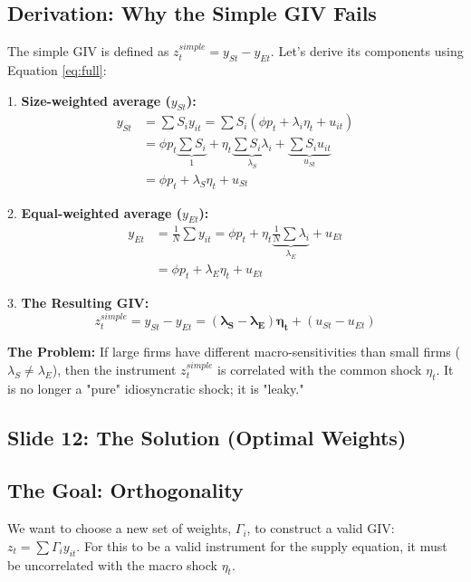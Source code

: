 \documentclass[12pt]{article}
\begin{document}
\subsection{Derivation: Why the Simple GIV Fails}
The simple GIV is defined as $z_t^{simple} = y_{St} - y_{Et}$. Let's derive its components using Equation \ref{eq:full}:

1. \textbf{Size-weighted average ($y_{St}$):}
\begin{align*}
    y_{St} & = \sum S_i y_{it} = \sum S_i (\phi p_t + \lambda_i \eta_t + u_{it})                                                               \\
           & = \phi p_t \underbrace{\sum S_i}_{1} + \eta_t \underbrace{\sum S_i \lambda_i}_{\lambda_S} + \underbrace{\sum S_i u_{it}}_{u_{St}} \\
           & = \phi p_t + \lambda_S \eta_t + u_{St}
\end{align*}

2. \textbf{Equal-weighted average ($y_{Et}$):}
\begin{align*}
    y_{Et} & = \frac{1}{N} \sum y_{it} = \phi p_t + \eta_t \underbrace{\frac{1}{N} \sum \lambda_i}_{\lambda_E} + u_{Et} \\
           & = \phi p_t + \lambda_E \eta_t + u_{Et}
\end{align*}

3. \textbf{The Resulting GIV:}
\begin{equation}
    z_t^{simple} = y_{St} - y_{Et} = \mathbf{(\lambda_S - \lambda_E) \eta_t} + (u_{St} - u_{Et})
\end{equation}

\textbf{The Problem:} If large firms have different macro-sensitivities than small firms ($\lambda_S \neq \lambda_E$), then the instrument $z_t^{simple}$ is correlated with the common shock $\eta_t$. It is no longer a "pure" idiosyncratic shock; it is "leaky."

\subsection{Slide 12: The Solution (Optimal Weights)}

\subsection{The Goal: Orthogonality}
We want to choose a new set of weights, $\Gamma_i$, to construct a valid GIV: $z_t = \sum \Gamma_i y_{it}$. For this to be a valid instrument for the supply equation, it must be uncorrelated with the macro shock $\eta_t$.
\end{document}
